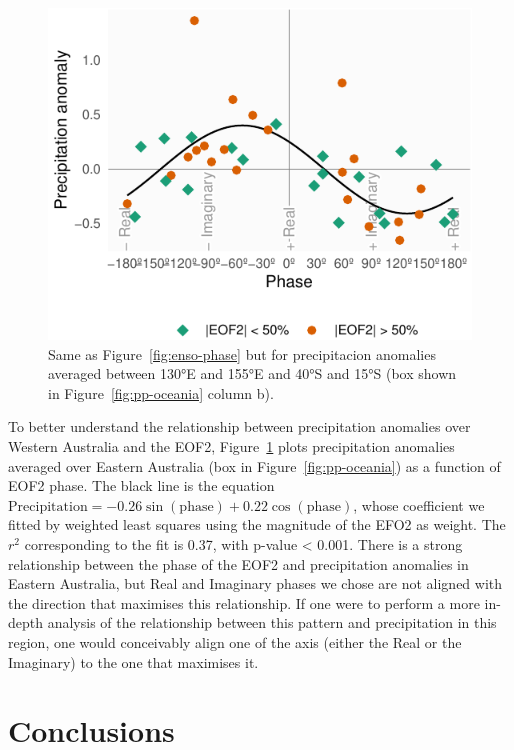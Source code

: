 \documentclass[smallextended]{svjour3}       %
\begin{document}
\begin{figure}
\centering
\includegraphics{../figures/australia-pp-phase-1.pdf}
\caption{\label{fig:australia-pp-phase}Same as Figure~\ref{fig:enso-phase} but for precipitacion anomalies averaged between 130°E and 155°E and 40°S and 15°S (box shown in Figure~\ref{fig:pp-oceania} column b).}
\end{figure}

To better understand the relationship between precipitation anomalies over Western Australia and the EOF2, Figure~\ref{fig:australia-pp-phase} plots precipitation anomalies averaged over Eastern Australia (box in Figure~\ref{fig:pp-oceania}) as a function of EOF2 phase. The black line is the equation \(\mathrm{Precipitation} = -0.26\sin{(\mathrm{phase})} + 0.22\cos{(\mathrm{phase})}\), whose coefficient we fitted by weighted least squares using the magnitude of the EFO2 as weight. The \(r^2\) corresponding to the fit is 0.37, with p-value \textless{} 0.001. There is a strong relationship between the phase of the EOF2 and precipitation anomalies in Eastern Australia, but Real and Imaginary phases we chose are not aligned with the direction that maximises this relationship. If one were to perform a more in-depth analysis of the relationship between this pattern and precipitation in this region, one would conceivably align one of the axis (either the Real or the Imaginary) to the one that maximises it.



\hypertarget{conclusions}{%
\section{Conclusions}\label{conclusions}}
\end{document}
